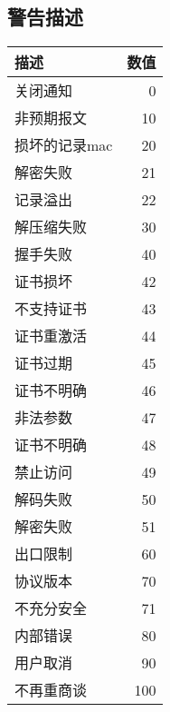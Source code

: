 \documentclass[11pt,dvips]{article}
\begin{document}
\subsection{警告描述}

\begin{center}
\begin{tabular}{|l|r|}
        \hline 
        描述& 数值 \\
        \hline
        关闭通知&0 \\
     非预期报文& 10 \\
 损坏的记录mac & 20\\
        解密失败& 21 \\
        记录溢出& 22 \\
     解压缩失败& 30 \\
        握手失败& 40 \\
        证书损坏& 42\\
     不支持证书& 43 \\
     证书重激活& 44\\
        证书过期& 45 \\
     证书不明确&46\\
        非法参数& 47\\
     证书不明确& 48\\
        禁止访问& 49\\
        解码失败& 50\\
        解密失败& 51\\
        出口限制& 60\\
        协议版本& 70\\
     不充分安全& 71\\
        内部错误& 80\\
        用户取消& 90\\
     不再重商谈& 100\\
        \hline

\end{tabular}

\end{center}







%
%
%
\end{document}
